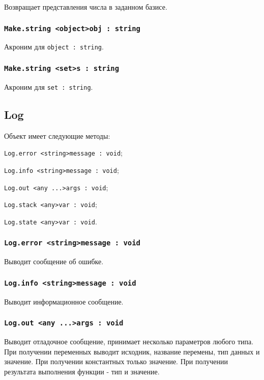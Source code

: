 Возвращает представления числа в заданном базисе.

\subsubsection{\lstinline|Make.string <object>obj : string|}

Акроним для \lstinline|object : string|.

\subsubsection{\lstinline|Make.string <set>s : string|}

Акроним для \lstinline|set : string|.

\subsection{{\color{orange} Log}}

Объект \logtype{} имеет следующие методы:
\begin{icItems}
	\item \lstinline|Log.error <string>message : void|;
	\item \lstinline|Log.info <string>message : void|;
	\item \lstinline|Log.out <any ...>args : void|;
	\item \lstinline|Log.stack <any>var : void|;
	\item \lstinline|Log.state <any>var : void|.
\end{icItems}

\subsubsection{\lstinline|Log.error <string>message : void|}

Выводит сообщение об ошибке.

\subsubsection{\lstinline|Log.info <string>message : void|}

Выводит информационное сообщение.

\subsubsection{\lstinline|Log.out <any ...>args : void|}

Выводит отладочное сообщение, принимает несколько параметров любого типа. При получении переменных выводит исходник, название перемены, тип данных и значение. При получении константных только значение. При получении результата выполнения функции - тип и значение. 

